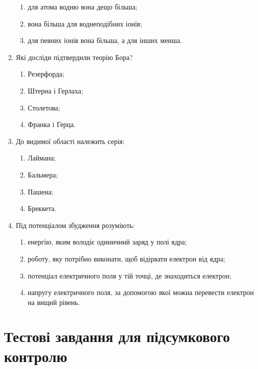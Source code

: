 \documentclass[twocolumn]{el-author}
\begin{document}
\begin{enumerate}
\begin{enumerate}
		\item для атома водню вона дещо більша;
		\item вона більша для воднеподібних іонів;
		\item для певних іонів вона більша, а для інших менша.
	\end{enumerate}
	\item Які досліди підтвердили теорію Бора?
	\begin{enumerate}
		\item Резерфорда;
		\item Штерна і Герлаха;
		\item Столетова;
		\item Франка і Герца.
	\end{enumerate}
	\item До видимої області належить серія:
	\begin{enumerate}
		\item Лаймана;
		\item Бальмера;
		\item Пашена;
		\item Бреккета.
	\end{enumerate}
	\item Під потенціалом збудження розуміють:
	\begin{enumerate}
		\item енергію, яким володіє одиничний заряд у полі ядра;
		\item роботу, яку потрібно виконати, щоб відірвати електрон від ядра;
		\item потенціал електричного поля у тій точці, де знаходиться електрон;
		\item напругу електричного поля, за допомогою якої можна перевести
електрон на вищий рівень.
	\end{enumerate}
\end{enumerate}

\newpage

\section{Тестові завдання для підсумкового контролю}
\end{document}
